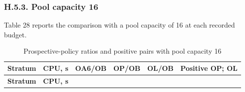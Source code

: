\documentclass[pdflatex,sn-basic,Numbered]{sn-jnl}
\begin{document}
\endgroup

\subsubsection*{H.5.3. Pool capacity 16}\label{h.5.3.-pool-capacity-16}

Table 28 reports the comparison with a pool capacity of 16 at each recorded budget.

\begingroup
\small
\setlength{\tabcolsep}{3pt}
\renewcommand{\arraystretch}{1.13}

\begin{longtable}[]{@{}
  >{\raggedright\arraybackslash}p{}
  >{\raggedleft\arraybackslash}p{}
  >{\raggedleft\arraybackslash}p{}
  >{\raggedleft\arraybackslash}p{}
  >{\raggedleft\arraybackslash}p{}
  >{\raggedright\arraybackslash}p{}@{}}
\caption{Prospective-policy ratios and positive pairs with pool capacity 16}\label{tab:28}\tabularnewline
\toprule\noalign{}
\begin{minipage}[b]{\linewidth}\raggedright
\textbf{Stratum}
\end{minipage} & \begin{minipage}[b]{\linewidth}\raggedleft
\textbf{CPU, s}
\end{minipage} & \begin{minipage}[b]{\linewidth}\raggedleft
\textbf{OA6/OB}
\end{minipage} & \begin{minipage}[b]{\linewidth}\raggedleft
\textbf{OP/OB}
\end{minipage} & \begin{minipage}[b]{\linewidth}\raggedleft
\textbf{OL/OB}
\end{minipage} & \begin{minipage}[b]{\linewidth}\raggedright
\textbf{Positive OP; OL}
\end{minipage} \\
\midrule\noalign{}
\endfirsthead
\toprule\noalign{}
\begin{minipage}[b]{\linewidth}\raggedright
\textbf{Stratum}
\end{minipage} & \begin{minipage}[b]{\linewidth}\raggedleft
\textbf{CPU, s}
\end{minipage} & \begin{minipage}[b]{\linewidth}\raggedleft

\end{minipage}
\end{longtable}
\end{document}

